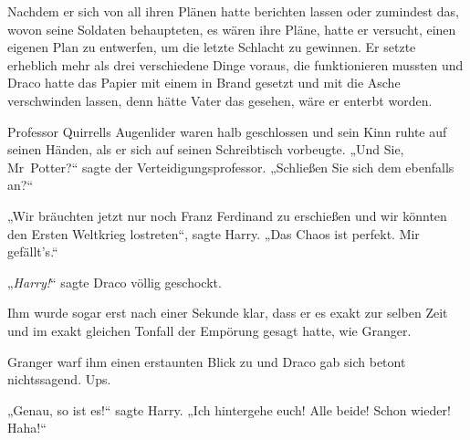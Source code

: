Nachdem er sich von all ihren Plänen hatte berichten lassen oder zumindest das, wovon seine Soldaten behaupteten, es wären ihre Pläne, hatte er versucht, einen eigenen Plan zu entwerfen, um die letzte Schlacht zu gewinnen. Er setzte erheblich mehr als drei verschiedene Dinge voraus, die funktionieren mussten und Draco hatte das Papier mit einem  in Brand gesetzt und mit  die Asche verschwinden lassen, denn hätte Vater das gesehen, wäre er enterbt worden.

Professor Quirrells Augenlider waren halb geschlossen und sein Kinn ruhte auf seinen Händen, als er sich auf seinen Schreibtisch vorbeugte. „Und Sie, Mr~Potter?“ sagte der Verteidigungsprofessor. „Schließen Sie sich dem ebenfalls an?“

„Wir bräuchten jetzt nur noch Franz Ferdinand zu erschießen und wir könnten den Ersten Weltkrieg lostreten“, sagte Harry. „Das Chaos ist perfekt. Mir gefällt’s.“

„\emph{Harry!}“ sagte Draco völlig geschockt.

Ihm wurde sogar erst nach einer Sekunde klar, dass er es exakt zur selben Zeit und im exakt gleichen Tonfall der Empörung gesagt hatte, wie Granger.

Granger warf ihm einen erstaunten Blick zu und Draco gab sich betont nichtssagend. Ups.

„Genau, so ist es!“ sagte Harry. „Ich hintergehe euch! Alle beide! Schon wieder! Haha!“

